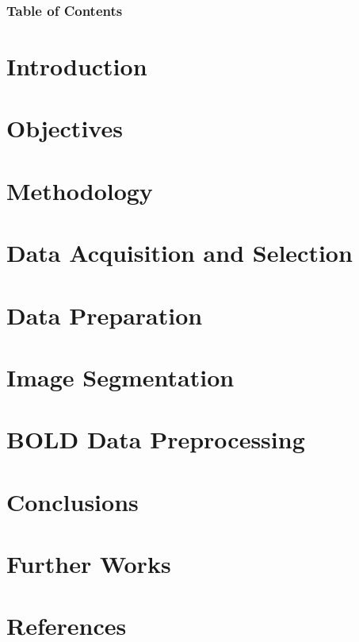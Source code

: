 \documentclass{beamer}
\begin{document}
\begin{frame}[t]
  \frametitle{Table of Contents}
  \tableofcontents
  \section{Introduction}
  \section{Objectives}
  \section{Methodology}
  \section{Data Acquisition and Selection}
  \section{Data Preparation}
  \section{Image Segmentation}
  \section{BOLD Data Preprocessing}
  \section{Conclusions}
  \section{Further Works}
  \section{References}
\end{frame}

\endgroup

\begingroup

\addtocounter{framenumber}{-2}
\end{document}
